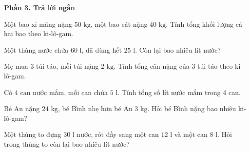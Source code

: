 \textbf{Phần 3. Trả lời ngắn}

\begin{ex} %
Một bao xi măng nặng $50\text{ kg}$, một bao cát nặng $40\text{ kg}$. Tính tổng khối lượng cả hai bao theo ki-lô-gam.
\end{ex}

\begin{ex} %
Một thùng nước chứa $60\text{ l}$, đã dùng hết $25\text{ l}$. Còn lại bao nhiêu lít nước?
\end{ex}

\begin{ex} %
Mẹ mua 3 túi táo, mỗi túi nặng $2\text{ kg}$. Tính tổng cân nặng của 3 túi táo theo ki-lô-gam.
\end{ex}

\begin{ex} %
Có 4 can nước mắm, mỗi can chứa $5\text{ l}$. Tính tổng số lít nước mắm trong 4 can.
\end{ex}

\begin{ex} %
Bé An nặng $24\text{ kg}$, bé Bình nhẹ hơn bé An $3\text{ kg}$. Hỏi bé Bình nặng bao nhiêu ki-lô-gam?
\end{ex}

\begin{ex} %
Một thùng to đựng $30\text{ l}$ nước, rót đầy sang một can $12\text{ l}$ và một can $8\text{ l}$. Hỏi trong thùng to còn lại bao nhiêu lít nước?
\end{ex}
